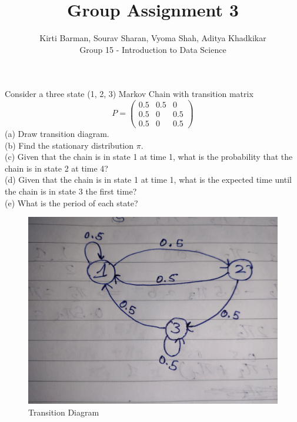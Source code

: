 \documentclass[12pt]{article}
\newenvironment{exercise}[2][Exercise]{\begin{trivlist}
\item[\hskip \labelsep {\bfseries #1}\hskip \labelsep {\bfseries #2.}]}{\end{trivlist}}
\begin{document}
\title{\LARGE Group Assignment 3} 
\author{\small Kirti Barman, Sourav Sharan, Vyoma Shah, Aditya Khadkikar \\ \small Group 15 - Introduction to Data Science} 

\maketitle


\begin{exercise}{1}
Consider a three state (1, 2, 3) Markov Chain with transition matrix
\[
P =
\begin{pmatrix}
0.5 & 0.5 & 0 \\
0.5 & 0 & 0.5 \\
0.5 & 0 & 0.5
\end{pmatrix}
\]
(a) Draw transition diagram. \\
(b) Find the stationary distribution $\pi$.\\
(c) Given that the chain is in state 1 at time 1, what is the probability
that the chain is in state 2 at time 4?\\
(d) Given that the chain is in state 1 at time 1, what is the expected
time until the chain is in state 3 the first time?\\
(e) What is the period of each state?\\
\end{exercise}
\begin{figure}
    \centering
    \includegraphics[width=0.4\linewidth]{Transition diagram.jpg}
    \caption{Transition Diagram}
    \label{fig:enter-label}
\end{figure}
\end{document}
